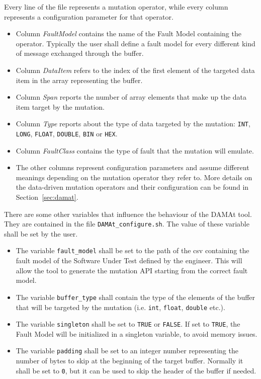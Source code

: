 Every line of the file represents a mutation operator, while every column represents a configuration parameter for that operator.

\begin{itemize}
  \item Column \emph{FaultModel} contains the name of the Fault Model containing the operator. Typically the user shall define a fault model for every different kind of message exchanged through the buffer.

  \item Column \emph{DataItem} refers to the index of the first element of the targeted data item in the array representing the buffer.

  \item Column \emph{Span} reports the number of array elements that make up the data item target by the mutation.

  \item Column \emph{Type} reports about the type of data targeted by the mutation: \texttt{INT}, \texttt{LONG}, \texttt{FLOAT}, \texttt{DOUBLE}, \texttt{BIN} or \texttt{HEX}.

  \item Column \emph{FaultClass} contains the type of fault that the mutation will emulate.

  \item The other columns represent configuration parameters and assume different meanings depending on the mutation operator they refer to. More details on the data-driven mutation operators and their configuration can be found in Section~\ref{sec:damat}.
\end{itemize}

There are some other variables that influence the behaviour of the DAMAt tool.
They are contained in the file \texttt{DAMAt\_configure.sh}. The value of these variable shall be set by the user.

\begin{itemize}
  \item The variable \texttt{fault\_model} shall be set to the path of the csv containing the fault model of the Software Under Test defined by the engineer.
  This will allow the tool to generate the mutation API starting from the correct fault model.
  \item The variable \texttt{buffer\_type} shall contain the type of the elements of the buffer that will be targeted by the mutation (i.e. \texttt{int}, \texttt{float}, \texttt{double} etc.).
  \item The variable \texttt{singleton} shall be set to \texttt{TRUE} or \texttt{FALSE}. If set to \texttt{TRUE}, the Fault Model will be initialized in a singleton variable, to avoid memory issues.
  \item The variable \texttt{padding} shall be set to an integer number representing the number of bytes to skip at the beginning of the target buffer. Normally it shall be set to \texttt{0}, but it can be used to skip the header of the buffer if needed.
\end{itemize}

